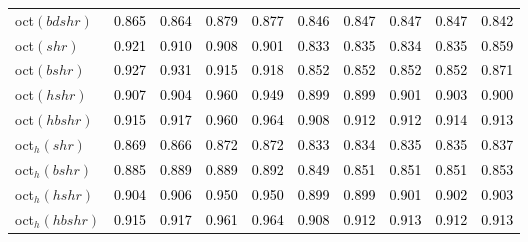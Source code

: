 \begin{tabular}[t]{>{\centering\arraybackslash}m{2.5cm}ccccccccc}
oct$(bdshr)$ & \textcolor{black}{0.865} & \textcolor{black}{0.864} & \textcolor{black}{0.879} & \textcolor{black}{0.877} & \textcolor{black}{0.846} & \textcolor{black}{0.847} & \textcolor{black}{0.847} & \textcolor{black}{0.847} & \textcolor{black}{0.842}\\
oct$(shr)$ & \textcolor{black}{0.921} & \textcolor{black}{0.910} & \textcolor{black}{0.908} & \textcolor{black}{0.901} & \textcolor{black}{0.833} & \textcolor{black}{0.835} & \textcolor{black}{0.834} & \textcolor{black}{0.835} & \textcolor{black}{0.859}\\
oct$(bshr)$ & \textcolor{black}{0.927} & \textcolor{black}{0.931} & \textcolor{black}{0.915} & \textcolor{black}{0.918} & \textcolor{black}{0.852} & \textcolor{black}{0.852} & \textcolor{black}{0.852} & \textcolor{black}{0.852} & \textcolor{black}{0.871}\\
oct$(hshr)$ & \textcolor{black}{0.907} & \textcolor{black}{0.904} & \textcolor{black}{0.960} & \textcolor{black}{0.949} & \textcolor{black}{0.899} & \textcolor{black}{0.899} & \textcolor{black}{0.901} & \textcolor{black}{0.903} & \textcolor{black}{0.900}\\
oct$(hbshr)$ & \textcolor{black}{0.915} & \textcolor{black}{0.917} & \textcolor{black}{0.960} & \textcolor{black}{0.964} & \textcolor{black}{0.908} & \textcolor{black}{0.912} & \textcolor{black}{0.912} & \textcolor{black}{0.914} & \textcolor{black}{0.913}\\
oct$_h(shr)$ & \textcolor{black}{0.869} & \textcolor{black}{0.866} & \textcolor{black}{0.872} & \textcolor{black}{0.872} & \textcolor{black}{0.833} & \textcolor{black}{0.834} & \textcolor{black}{0.835} & \textcolor{black}{0.835} & \textcolor{black}{0.837}\\
oct$_h(bshr)$ & \textcolor{black}{0.885} & \textcolor{black}{0.889} & \textcolor{black}{0.889} & \textcolor{black}{0.892} & \textcolor{black}{0.849} & \textcolor{black}{0.851} & \textcolor{black}{0.851} & \textcolor{black}{0.851} & \textcolor{black}{0.853}\\
oct$_h(hshr)$ & \textcolor{black}{0.904} & \textcolor{black}{0.906} & \textcolor{black}{0.950} & \textcolor{black}{0.950} & \textcolor{black}{0.899} & \textcolor{black}{0.899} & \textcolor{black}{0.901} & \textcolor{black}{0.902} & \textcolor{black}{0.903}\\
oct$_h(hbshr)$ & \textcolor{black}{0.915} & \textcolor{black}{0.917} & \textcolor{black}{0.961} & \textcolor{black}{0.964} & \textcolor{black}{0.908} & \textcolor{black}{0.912} & \textcolor{black}{0.913} & \textcolor{black}{0.912} & \textcolor{black}{0.913}\\
\bottomrule
\end{tabular}
